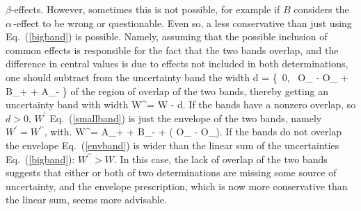 $\beta$-effects. However, sometimes this is not possible, for example if 
$B$ considers the $\alpha\,$-effect to be wrong or questionable. 
Even so, a less conservative than just using Eq.~(\ref{bigband}) is possible. 
Namely, assuming that the possible inclusion of common effects is responsible 
for the fact that the two bands overlap, and the difference in central values 
is due to effects not included in both determinations, one should subtract 
from the uncertainty band the width
\bq
d = \max\{\, 0, \, {\cal O}_{\ssB} - {\cal O}_{\ssA} 
               + \Delta B_+ + \Delta A_- \}
\label{bigoverlap}
\eq
of the  region of overlap of the two bands, thereby getting an uncertainty band
with width
\bq
W^\prime= W - d.
\label{smallband}
\eq
If the bands have a nonzero overlap, so $d> 0$, $W^\prime$ Eq.~(\ref{smallband}) is 
just the envelope of the two bands, namely $W^\prime= W^{\prime\prime}$, with.
\bq
W^{\prime\prime}= \Delta A_+ + \Delta B_- + 
\Bigl( {\cal O}_{\ssA} - {\cal O}_{\ssB}\Bigr).
\label{envband}
\eq
If the bands do not overlap
the envelope Eq.~(\ref{envband}) is wider than the linear sum of the 
uncertainties Eq.~(\ref{bigband}): $W^{\prime\prime}>W$. In this case, the 
lack of overlap of the two bands suggests that either or both of
two determinations are missing some source of uncertainty, and the 
envelope prescription, which is now more conservative than the linear
sum, seems more advisable.

